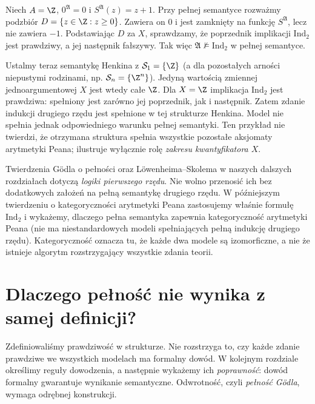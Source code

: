 \begin{przyklad}
Niech $A=\Z$, $0^{\mathfrak A}=0$ i
$S^{\mathfrak A}(z)=z+1$. Przy pełnej semantyce rozważmy
podzbiór $D=\{z\in\Z:z\geq0\}$. Zawiera on $0$
i jest zamknięty na funkcję $S^{\mathfrak A}$,
lecz nie zawiera $-1$. Podstawiając $D$ za $X$,
sprawdzamy, że poprzednik implikacji $\mathrm{Ind}_2$
jest prawdziwy, a jej następnik fałszywy.
Tak więc $\mathfrak A\not\models\mathrm{Ind}_2$
w pełnej semantyce.

Ustalmy teraz semantykę Henkina z
$\mathcal S_1=\{\Z\}$ (a dla pozostałych arności
niepustymi rodzinami, np. $\mathcal S_n=\{\Z^n\}$).
Jedyną wartością zmiennej jednoargumentowej $X$
jest wtedy całe $\Z$. Dla $X=\Z$ implikacja
$\mathrm{Ind}_2$ jest prawdziwa: spełniony jest zarówno
jej poprzednik, jak i następnik.
Zatem zdanie indukcji drugiego rzędu jest spełnione
w tej strukturze Henkina. Model nie spełnia jednak
odpowiedniego warunku pełnej semantyki.
Ten przykład nie twierdzi, że otrzymana struktura
spełnia wszystkie pozostałe aksjomaty arytmetyki Peana;
ilustruje wyłącznie rolę \emph{zakresu kwantyfikatora $X$}.
\end{przyklad}

\begin{uwaga}
Twierdzenia Gödla o pełności oraz Löwenheima--Skolema
w naszych dalszych rozdziałach dotyczą \emph{logiki pierwszego
rzędu}. Nie wolno przenosić ich bez dodatkowych założeń
na pełną semantykę drugiego rzędu. W
późniejszym twierdzeniu o kategoryczności arytmetyki Peana
zastosujemy właśnie formułę $\mathrm{Ind}_2$ i wykażemy, dlaczego
pełna semantyka zapewnia kategoryczność arytmetyki Peana
(nie ma niestandardowych modeli spełniających pełną indukcję
drugiego rzędu). Kategoryczność oznacza tu, że każde dwa modele
są izomorficzne, a nie że istnieje algorytm rozstrzygający
wszystkie zdania teorii.
\end{uwaga}

\section{Dlaczego pełność nie wynika z samej definicji?}
Zdefiniowaliśmy prawdziwość w strukturze. Nie rozstrzyga to,
czy każde zdanie prawdziwe we wszystkich modelach ma formalny dowód.
W kolejnym rozdziale określimy reguły dowodzenia, a następnie
wykażemy ich \emph{poprawność}: dowód formalny gwarantuje
wynikanie semantyczne. Odwrotność, czyli \emph{pełność Gödla},
wymaga odrębnej konstrukcji.